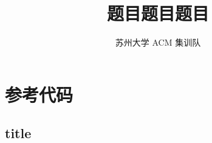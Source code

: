 \documentclass[lang=cn]{elegantpaper}
\title{题目题目题目}
\author{苏州大学 ACM 集训队}
\newcommand\addCode[1]{%
    \subsection{#1}%
    }
\begin{document}
\isBeamerMode\relax
    \maketitle
    \tableofcontents
\fi

\isBeamerMode\relax
    \frame{\titlepage}
\fi







\isBeamerMode\relax
    \section{参考代码}
    \addCode{title}
\fi
\end{document}
